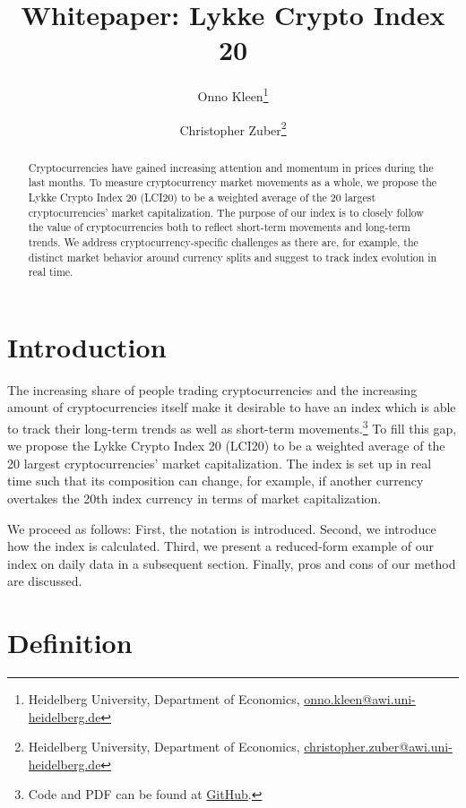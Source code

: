 \documentclass[11pt]{article}
\title{Whitepaper: Lykke Crypto Index 20}
\author{
Onno Kleen\thanks{Heidelberg University, Department of Economics, \href{mailto:onno.kleen@awi.uni-heidelberg.de}{onno.kleen@awi.uni-heidelberg.de}}
\and
Christopher Zuber\thanks{Heidelberg University, Department of Economics, \href{mailto:christopher.zuber@awi.uni-heidelberg.de}{christopher.zuber@awi.uni-heidelberg.de}}
}
\begin{document}
\maketitle

\begin{abstract}
    Cryptocurrencies have gained increasing attention and momentum in prices during the last months.
    To measure cryptocurrency market movements as a whole, we propose the Lykke Crypto Index 20 (LCI20) to be a weighted average of the 20 largest cryptocurrencies' market capitalization.
    The purpose of our index is to closely follow the value of cryptocurrencies both to reflect short-term movements and long-term trends.
    We address cryptocurrency-specific challenges as there are, for example, the distinct market behavior around currency splits and suggest to track index evolution in real time.
\end{abstract}


\section{Introduction}

The increasing share of people trading cryptocurrencies and the increasing amount of cryptocurrencies itself make it desirable to have an index which is able to track their long-term trends as well as short-term movements.\footnote{Code and PDF can be found at \href{https://github.com/onnokleen/crypto-index}{GitHub}.}
To fill this gap, we propose the Lykke Crypto Index 20 (LCI20) to be a weighted average of the 20 largest cryptocurrencies' market capitalization.
The index is set up in real time such that its composition can change, for example, if another currency overtakes the 20th index currency in terms of market capitalization.

We proceed as follows:
First, the notation is introduced.
Second, we introduce how the index is calculated.
Third, we present a reduced-form example of our index on daily data in a subsequent section.
Finally, pros and cons of our method are discussed.


\section{Definition}
\end{document}
